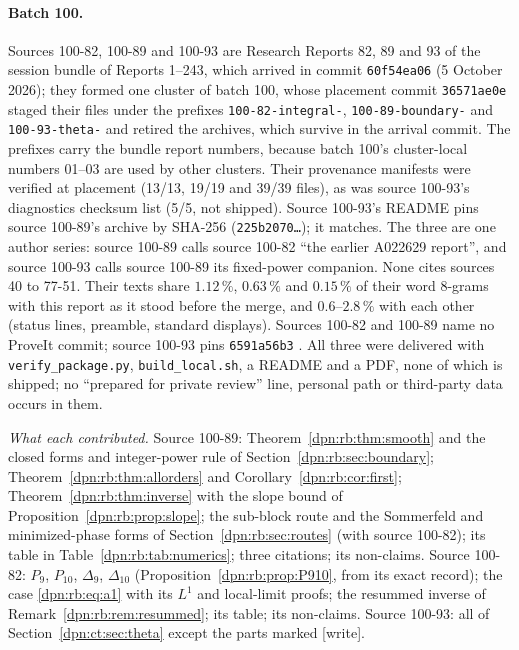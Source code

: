 \documentclass[11pt]{article}
\numberwithin{equation}{section}
\theoremstyle{definition}\newtheorem{definition}[theorem]{Definition}
\theoremstyle{remark}\newtheorem{remark}[theorem]{Remark}
\newcommand{\file}[1]{\nolinkurl{#1}}
\newcommand{\wrt}{\textup{[write]}}
\begin{document}
\paragraph{Batch 100.}
Sources 100-82, 100-89 and 100-93 are Research Reports 82, 89 and 93 of the
session bundle of Reports 1--243, which arrived in commit \texttt{60f54ea06}
(5 October 2026); they formed one cluster of batch 100, whose placement
commit \texttt{36571ae0e} staged their files under the prefixes
\file{100-82-integral-}, \file{100-89-boundary-} and \file{100-93-theta-} and
retired the archives, which survive in the arrival commit.  The prefixes carry
the bundle report numbers, because batch 100's cluster-local numbers 01--03
are used by other clusters.  Their provenance manifests were verified at
placement (13/13, 19/19 and 39/39 files), as was source 100-93's diagnostics
checksum list (5/5, not shipped).  Source 100-93's README pins source 100-89's
archive by SHA-256 (\texttt{225b2070\ldots}); it matches.  The three are one
author series: source 100-89 calls source 100-82 ``the earlier A022629
report'', and source 100-93 calls source 100-89 its fixed-power companion.
None cites sources 40 to 77-51.  Their texts share $1.12\,\%$, $0.63\,\%$ and
$0.15\,\%$ of their word 8-grams with this report as it stood before the merge,
and $0.6$--$2.8\,\%$ with each other (status lines, preamble, standard
displays).  Sources 100-82 and 100-89 name no ProveIt commit; source 100-93 pins
\texttt{6591a56b3} \cite{proveit93}.  All three were delivered with
\file{verify_package.py}, \file{build_local.sh}, a README and a PDF, none of
which is shipped; no ``prepared for private review'' line, personal path or
third-party data occurs in them.

\emph{What each contributed.}  Source 100-89: Theorem~\ref{dpn:rb:thm:smooth}
and the closed forms and integer-power rule of
Section~\ref{dpn:rb:sec:boundary}; Theorem~\ref{dpn:rb:thm:allorders} and
Corollary~\ref{dpn:rb:cor:first}; Theorem~\ref{dpn:rb:thm:inverse} with the slope
bound of Proposition~\ref{dpn:rb:prop:slope}; the sub-block route and the
Sommerfeld and minimized-phase forms of Section~\ref{dpn:rb:sec:routes} (with
source 100-82); its table in Table~\ref{dpn:rb:tab:numerics}; three citations;
its non-claims.  Source 100-82: $P_9$, $P_{10}$, $\Delta_9$, $\Delta_{10}$
(Proposition~\ref{dpn:rb:prop:P910}, from its exact record); the case
\eqref{dpn:rb:eq:a1} with its $L^1$ and local-limit proofs; the resummed inverse
of Remark~\ref{dpn:rb:rem:resummed}; its table; its non-claims.  Source 100-93:
all of Section~\ref{dpn:ct:sec:theta} except the parts marked \wrt.
\end{document}
